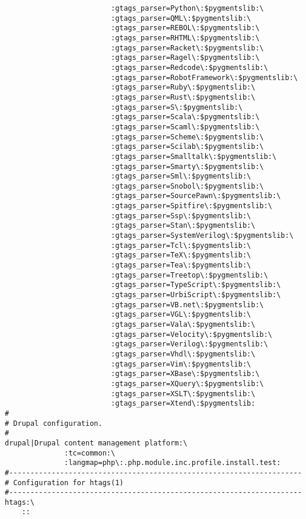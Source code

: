 \documentclass[11pt]{article}
\begin{document}
\begin{lstlisting}
                         :gtags_parser=Python\:$pygmentslib:\
                         :gtags_parser=QML\:$pygmentslib:\
                         :gtags_parser=REBOL\:$pygmentslib:\
                         :gtags_parser=RHTML\:$pygmentslib:\
                         :gtags_parser=Racket\:$pygmentslib:\
                         :gtags_parser=Ragel\:$pygmentslib:\
                         :gtags_parser=Redcode\:$pygmentslib:\
                         :gtags_parser=RobotFramework\:$pygmentslib:\
                         :gtags_parser=Ruby\:$pygmentslib:\
                         :gtags_parser=Rust\:$pygmentslib:\
                         :gtags_parser=S\:$pygmentslib:\
                         :gtags_parser=Scala\:$pygmentslib:\
                         :gtags_parser=Scaml\:$pygmentslib:\
                         :gtags_parser=Scheme\:$pygmentslib:\
                         :gtags_parser=Scilab\:$pygmentslib:\
                         :gtags_parser=Smalltalk\:$pygmentslib:\
                         :gtags_parser=Smarty\:$pygmentslib:\
                         :gtags_parser=Sml\:$pygmentslib:\
                         :gtags_parser=Snobol\:$pygmentslib:\
                         :gtags_parser=SourcePawn\:$pygmentslib:\
                         :gtags_parser=Spitfire\:$pygmentslib:\
                         :gtags_parser=Ssp\:$pygmentslib:\
                         :gtags_parser=Stan\:$pygmentslib:\
                         :gtags_parser=SystemVerilog\:$pygmentslib:\
                         :gtags_parser=Tcl\:$pygmentslib:\
                         :gtags_parser=TeX\:$pygmentslib:\
                         :gtags_parser=Tea\:$pygmentslib:\
                         :gtags_parser=Treetop\:$pygmentslib:\
                         :gtags_parser=TypeScript\:$pygmentslib:\
                         :gtags_parser=UrbiScript\:$pygmentslib:\
                         :gtags_parser=VB.net\:$pygmentslib:\
                         :gtags_parser=VGL\:$pygmentslib:\
                         :gtags_parser=Vala\:$pygmentslib:\
                         :gtags_parser=Velocity\:$pygmentslib:\
                         :gtags_parser=Verilog\:$pygmentslib:\
                         :gtags_parser=Vhdl\:$pygmentslib:\
                         :gtags_parser=Vim\:$pygmentslib:\
                         :gtags_parser=XBase\:$pygmentslib:\
                         :gtags_parser=XQuery\:$pygmentslib:\
                         :gtags_parser=XSLT\:$pygmentslib:\
                         :gtags_parser=Xtend\:$pygmentslib:
#
# Drupal configuration.
#
drupal|Drupal content management platform:\
              :tc=common:\
              :langmap=php\:.php.module.inc.profile.install.test:
#---------------------------------------------------------------------
# Configuration for htags(1)
#---------------------------------------------------------------------
htags:\
    ::
\end{lstlisting}
\end{document}
